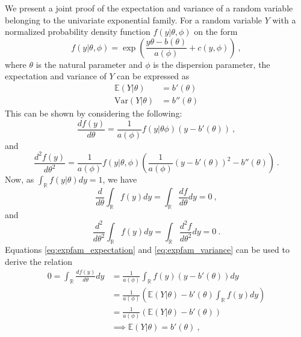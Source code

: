 We present a joint proof of the expectation and variance of a random variable belonging to the univariate exponential family.
For a random variable $Y$ with a normalized probability density function $f(y \lvert \theta, \phi)$ on the form
\begin{equation}
    f(y \lvert \theta, \phi) = \exp\left( \frac{y\theta - b(\theta)}{a(\phi)} + c(y, \phi) \right) \ ,
\end{equation}
where $\theta$ is the natural parameter and $\phi$ is the dispersion parameter, the expectation and variance of $Y$ can be expressed as
\begin{equation}
    \begin{aligned}
        \mathbb{E}(Y \lvert \theta) &= b'(\theta) \\
        \text{Var}(Y \lvert \theta) &= b''(\theta)
    \end{aligned}
\end{equation}
This can be shown by considering the following:
\begin{equation}
    \frac{d f(y)}{d\theta} = \frac{1}{a(\phi)} f(y \lvert \theta \phi) (y-b'(\theta))  \ ,
\end{equation}
and 
\begin{equation}
    \frac{d^2 f(y)}{d\theta^2} = \frac{1}{a(\phi)}f(y \lvert \theta, \phi) \left( \frac{1}{a(\phi)}(y-b'(\theta))^2 - b''(\theta) \right) \ .
\end{equation}
Now, as $\int_{\mathbb{R}} f(y \lvert \theta) dy = 1$, we have 
\begin{equation}
    \label{eq:expfam_expectation}
    \frac{d}{d \theta} \int_{\mathbb{R}} f(y) dy  = \int_{\mathbb{R}} \frac{d f}{d\theta} dy = 0 \ ,
\end{equation}
and 
\begin{equation}
    \label{eq:expfam_variance}
    \frac{d^2}{d \theta^2} \int_{\mathbb{R}} f(y) dy = \int_{\mathbb{R}} \frac{d^2 f}{d\theta^2} dy = 0 \ .
\end{equation}
Equations \eqref{eq:expfam_expectation} and \eqref{eq:expfam_variance} can be used to derive the relation 
\begin{equation}
    \begin{aligned}
    0 = \int_{\mathbb{R}} \frac{d f(y)}{d\theta} dy &= \frac{1}{a(\phi)}\int_{\mathbb{R}} f(y) (y-b'(\theta)) dy \\
    & = \frac{1}{a(\phi)} \left(\mathbb{E}(Y \lvert \theta) - b'(\theta)\int_{\mathbb{R}}f(y)dy \right) \\
    & = \frac{1}{a(\phi)} \left( \mathbb{E}(Y \lvert \theta) - b'(\theta) \right) \\
    & \implies \mathbb{E}(Y \lvert \theta) = b'(\theta) \ ,
    \end{aligned}
\end{equation}
